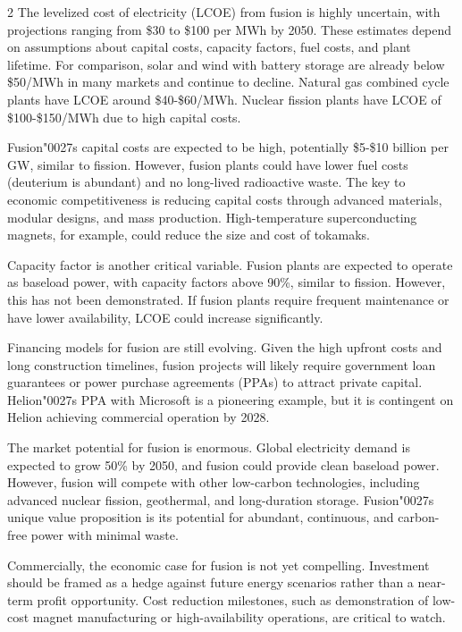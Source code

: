 \documentclass[10pt,a4paper]{article}
\newcommand{\BOApos}{{\BOQuoteFont\char"0027}}
\begin{document}
\begin{multicols}{2}
{\small The levelized cost of electricity (LCOE) from fusion is highly uncertain, with projections ranging from \$30 to \$100 per MWh by 2050. These estimates depend on assumptions about capital costs, capacity factors, fuel costs, and plant lifetime. For comparison, solar and wind with battery storage are already below \$50/MWh in many markets and continue to decline. Natural gas combined cycle plants have LCOE around \$40-\$60/MWh. Nuclear fission plants have LCOE of \$100-\$150/MWh due to high capital costs.}\par
{\small Fusion\BOApos{}s capital costs are expected to be high, potentially \$5-\$10 billion per GW, similar to fission. However, fusion plants could have lower fuel costs (deuterium is abundant) and no long-lived radioactive waste. The key to economic competitiveness is reducing capital costs through advanced materials, modular designs, and mass production. High-temperature superconducting magnets, for example, could reduce the size and cost of tokamaks.}\par
{\small Capacity factor is another critical variable. Fusion plants are expected to operate as baseload power, with capacity factors above 90\%, similar to fission. However, this has not been demonstrated. If fusion plants require frequent maintenance or have lower availability, LCOE could increase significantly.}\par
{\small Financing models for fusion are still evolving. Given the high upfront costs and long construction timelines, fusion projects will likely require government loan guarantees or power purchase agreements (PPAs) to attract private capital. Helion\BOApos{}s PPA with Microsoft is a pioneering example, but it is contingent on Helion achieving commercial operation by 2028.}\par
{\small The market potential for fusion is enormous. Global electricity demand is expected to grow 50\% by 2050, and fusion could provide clean baseload power. However, fusion will compete with other low-carbon technologies, including advanced nuclear fission, geothermal, and long-duration storage. Fusion\BOApos{}s unique value proposition is its potential for abundant, continuous, and carbon-free power with minimal waste.}\par
{\small Commercially, the economic case for fusion is not yet compelling. Investment should be framed as a hedge against future energy scenarios rather than a near-term profit opportunity. Cost reduction milestones, such as demonstration of low-cost magnet manufacturing or high-availability operations, are critical to watch.}\par
\end{multicols}
\label{chap:3:end}
\end{document}
